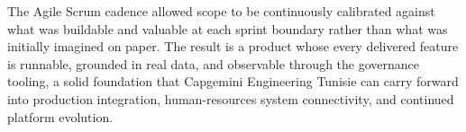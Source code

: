 The Agile Scrum cadence allowed scope to be continuously calibrated against what was buildable and valuable at each sprint boundary rather than what was initially imagined on paper. The result is a product whose every delivered feature is runnable, grounded in real data, and observable through the governance tooling, a solid foundation that Capgemini Engineering Tunisie can carry forward into production integration, human-resources system connectivity, and continued platform evolution.
